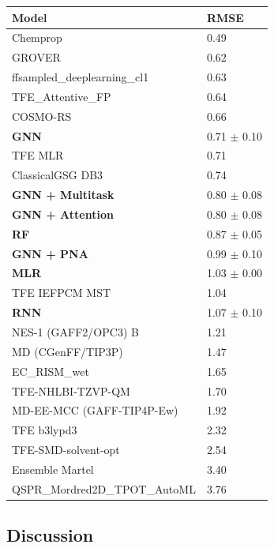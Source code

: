 \documentclass{article}
\theoremstyle{definition}
\theoremstyle{remark}
\begin{document}
\begin{center}
\begin{tabular}{ | m{5cm} | m{2.5cm}| } 
  \hline
  \textbf{Model} & \textbf{RMSE} \\ 
  \hline
  Chemprop & 0.49 \\ 
  \hline
  GROVER & 0.62 \\ 
  \hline
  ffsampled\_deeplearning\_cl1 & 0.63 \\ 
  \hline
  TFE\_Attentive\_FP & 0.64 \\ 
  \hline
  COSMO-RS & 0.66 \\
  \hline
  \textbf{GNN} & 0.71 $\pm$ 0.10 \\ 
  \hline
  TFE MLR & 0.71 \\ 
  \hline
  ClassicalGSG DB3 & 0.74 \\ 
  \hline
  \textbf{GNN + Multitask} & 0.80 $\pm$ 0.08 \\
  \hline
  \textbf{GNN + Attention} & 0.80 $\pm$ 0.08 \\
  \hline
  \textbf{RF} & 0.87 $\pm$ 0.05 \\
  \hline
  \textbf{GNN + PNA} & 0.99 $\pm$ 0.10 \\
  \hline
  \textbf{MLR} & 1.03 $\pm$ 0.00 \\ 
  \hline
  TFE IEFPCM MST & 1.04 \\ 
  \hline
  \textbf{RNN} & 1.07 $\pm$ 0.10 \\
  \hline
  NES-1 (GAFF2/OPC3) B & 1.21 \\ 
  \hline
  MD (CGenFF/TIP3P)	 & 1.47 \\ 
  \hline
  EC\_RISM\_wet & 1.65 \\ 
  \hline
  TFE-NHLBI-TZVP-QM & 1.70 \\ 
  \hline
  MD-EE-MCC (GAFF-TIP4P-Ew)	 & 1.92 \\ 
  \hline
  TFE b3lypd3 & 2.32 \\ 
  \hline
  TFE-SMD-solvent-opt & 2.54 \\ 
  \hline
  Ensemble Martel & 3.40 \\ 
  \hline
  QSPR\_Mordred2D\_TPOT\_AutoML & 3.76 \\ 
  \hline
\end{tabular}
\captionsetup{width=0.8\textwidth}
\label{table5}
\end{center}

\subsection{Discussion}
\end{document}
